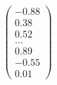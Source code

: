 \documentclass[preview]{standalone}
\begin{document}
\begin{align*}
\begin{pmatrix} -0.88 \\ 0.38 \\ 0.52 \\ \dots \\ 0.89 \\ -0.55 \\ 0.01 \end{pmatrix}
\end{align*}
\end{document}

